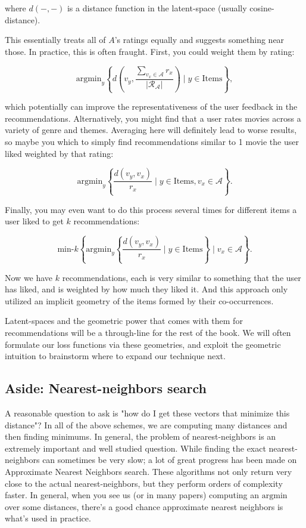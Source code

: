 where $d(-,-)$ is a distance function in the latent-space (usually cosine-distance).

This essentially treats all of $A$'s ratings equally and suggests something near those. In practice, this is often fraught. First, you could weight them by rating:

\begin{equation}
	\textrm{argmin}_y\left\lbrace d(v_y,\frac{\sum_{v_x\in\mathcal{A}}r_x}{|\mathcal{R_A}|})\mid y\in \textrm{Items}\right\rbrace,
\end{equation}

which potentially can improve the representativeness of the user feedback in the recommendations. Alternatively, you might find that a user rates movies across a variety of genre and themes. Averaging here will definitely lead to worse results, so maybe you which to simply find recommendations similar to 1 movie the user liked weighted by that rating:

\begin{equation}
	\textrm{argmin}_y\left\lbrace \frac{d(v_y,v_x)}{r_x}\mid y\in \textrm{Items}, v_x\in\mathcal{A}\right\rbrace.
\end{equation}

Finally, you may even want to do this process several times for different items a user liked to get $k$ recommendations:

\begin{equation}
	\textrm{min-}k \left\lbrace \textrm{argmin}_y\left\lbrace \frac{d(v_y,v_x)}{r_x}\mid y\in \textrm{Items}\right\rbrace\mid v_x\in\mathcal{A}\right\rbrace.
\end{equation}

Now we have $k$ recommendations, each is very similar to something that the user has liked, and is weighted by how much they liked it. And this approach only utilized an implicit geometry of the items formed by their co-occurrences. 

Latent-spaces and the geometric power that comes with them for recommendations will be a through-line for the rest of the book. We will often formulate our loss functions via these geometries, and exploit the geometric intuition to brainstorm where to expand our technique next. 

\subsection{Aside: Nearest-neighbors search}

A reasonable question to ask is "how do I get these vectors that minimize this distance"? In all of the above schemes, we are computing many distances and then finding minimums. In general, the problem of nearest-neighbors is an extremely important and well studied question. While finding the exact nearest-neighbors can sometimes be very slow; a lot of great progress has been made on Approximate Nearest Neighbors search. These algorithms not only return very close to the actual nearest-neighbors, but they perform orders of complexity faster. In general, when you see us (or in many papers) computing an $\textrm{argmin}$ over some distances, there's a good chance approximate nearest neighbors is what's used in practice.